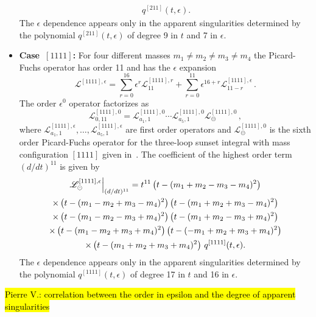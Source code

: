 \documentclass[a4paper,12pt]{article}
\numberwithin{equation}{section}
\numberwithin{figure}{section}
\def\su{\circleddash}
\newcommand{\pvnote}[1]{\sethlcolor{bubblegum} \protect\hl{Pierre V.: #1} \sethlcolor{yellow}}
\begin{document}
\begin{itemize}
\begin{multline}
                   \, q^{[211]}(t,\epsilon).
                 \end{multline}
                 The $\epsilon$ dependence appears only in the
                 apparent singularities determined by the polynomial
                 $q^{[211]}(t,\epsilon)$ of degree 9 in $t$  and 7 in $\epsilon$.
  \item   {\bf Case~$[1111]$:} For four different masses $m_1\neq m_2\neq m_3 \neq m_4$ the
  Picard-Fuchs operator has order 11 and has the $\epsilon$ expansion 
  \begin{equation}
    \mathscr{L}^{[1111],\epsilon}=     \sum_{r=0}^{16}\epsilon^r
    \mathscr{L}^{[1111],r}_{11}+\sum_{r=0}^{11} \epsilon^{16+r}  \mathscr{L}^{[1111],\epsilon}_{11-r}\, .
  \end{equation}
    The order $\epsilon^0$ operator factorizes as
  \begin{equation}
         \mathscr{L}^{[1111],0}_{0,11}=   \mathscr{L}^{[1111],0}_{a_1,1}  \cdots  \mathscr{L}^{[1111],0}_{a_5,1}   \mathscr{L}^{[1111],0}_{\su}\,,
       \end{equation}
        where  $ \mathscr{L}^{[1111],\epsilon}_{a_1,1},\dots,  \mathscr{L}^{[1111],\epsilon}_{a_5,1}$ are  first order operators
       and $\mathscr{L}^{[1111],0}_{\su}$ is the sixth  order  Picard-Fuchs operator for the
       three-loop sunset integral with mass configuration $[1111]$
       given in~\cite{Lairez:2022zkj}.
        The coefficient of the highest order term $(d/dt)^{11}$    is given by
       \begin{multline}
                   \mathscr{L}^{[1111],\epsilon}_\su\Big\vert_{(d/dt)^{11}}=
                   t^{11}\left(t-(m_{1}+m_{2}-m_{3}-m_{4})^2\right) \cr\times
   \left(t-(m_{1}-m_{2}+m_{3}-m_{4})^2\right)
   \left(t-(m_{1}+m_{2}+m_{3}-m_{4})^2\right) \cr\times
   \left(t-(m_{1}-m_{2}-m_{3}+m_{4})^2\right)
   \left(t-(m_{1}+m_{2}-m_{3}+m_{4})^2\right)\cr\times
   \left(t-(m_{1}-m_{2}+m_{3}+m_{4})^2\right)
   \left(t-(-m_{1}+m_{2}+m_{3}+m_{4})^2\right) \cr\times
   \left(t-(m_{1}+m_{2}+m_{3}+m_{4})^2\right)
                   \, q^{[1111]}(t,\epsilon).
                 \end{multline}
                 The $\epsilon$ dependence appears only in the
                 apparent singularities determined by the polynomial
                 $q^{[1111]}(t,\epsilon)$ of degree 17 in
                 $t$ and 16 in $\epsilon$.
     \end{itemize}
\pvnote{correlation between the order in epsilon and the degree of
  apparent singularities}
\end{document}
